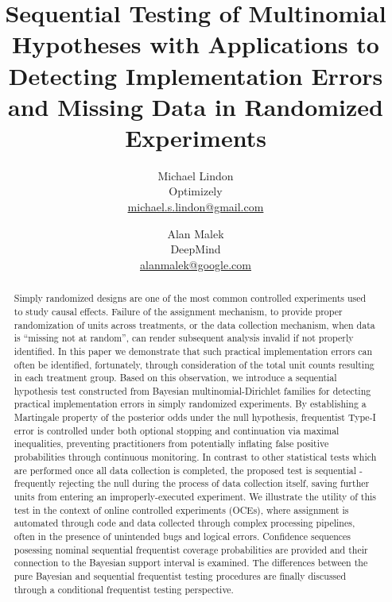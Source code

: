 \documentclass[11pt]{article}
\begin{document}
\vspace{-1in}
\title{Sequential Testing of Multinomial Hypotheses with Applications to Detecting Implementation Errors and Missing Data in Randomized Experiments}
\author{\Large Michael Lindon \\ Optimizely \\ \href{mailto:michael.s.lindon@gmail.com}{michael.s.lindon@gmail.com}  \and \Large Alan Malek \\ DeepMind \\ \href{mailto:alanmalek@google.com}{alanmalek@google.com}}
\maketitle 
\begin{abstract}
  Simply randomized designs are one of the most common controlled experiments used to study causal effects.
  Failure of the assignment mechanism, to provide proper randomization of units across treatments, or the data collection mechanism, when data is ``missing not at random'', can render subsequent analysis invalid if not properly identified.
In this paper we demonstrate that such practical implementation errors can often be identified, fortunately, through consideration of the total unit counts resulting in each treatment group.
  Based on this observation, we introduce a sequential hypothesis test constructed from Bayesian multinomial-Dirichlet families for detecting practical implementation errors in simply randomized experiments.
By establishing a Martingale property of the posterior odds under the null hypothesis, frequentist Type-I error is controlled under both optional stopping and continuation via maximal inequalities, preventing practitioners from potentially inflating false positive probabilities through continuous monitoring.
  In contrast to other statistical tests which are performed once all data collection is completed, the proposed test is sequential - frequently rejecting the null during the process of data collection itself, saving further units from entering an improperly-executed experiment.
  We illustrate the utility of this test in the context of online controlled experiments (OCEs), where assignment is automated through code and data collected through complex processing pipelines, often in the presence of unintended bugs and logical errors.
Confidence sequences posessing nominal sequential frequentist coverage probabilities are provided and their connection to the Bayesian support interval is examined.
The differences between the pure Bayesian and sequential frequentist testing procedures are finally discussed through a conditional frequentist testing perspective.
 
\end{abstract}
\end{document}
